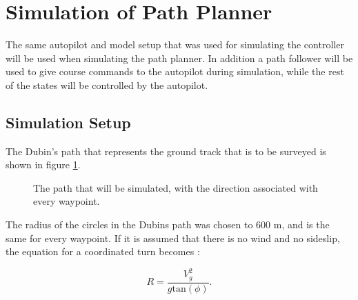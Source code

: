 \section{Simulation of Path Planner}

The same autopilot and model setup that was used for simulating the controller will be used when simulating the path planner. In addition a path follower will be used to give course commands to the autopilot during simulation, while the rest of the states will be controlled by the autopilot.


\subsection{Simulation Setup}

The Dubin's path that represents the ground track that is to be surveyed is shown in figure \ref{fig:dubins_reference}.

\begin{figure}[]
    \centering
    \caption{The path that will be simulated, with the direction associated with every waypoint.}
	\label{fig:dubins_reference}
\end{figure}

The radius of the circles in the Dubins path was chosen to $600$ m, and is the same for every waypoint. If it is assumed that there is no wind and no sideslip, the equation for a coordinated turn becomes \cite{suaBEARD}:

\begin{equation}
	R = \frac{V_g^2}{g\text{tan}(\phi)}.
\end{equation}

